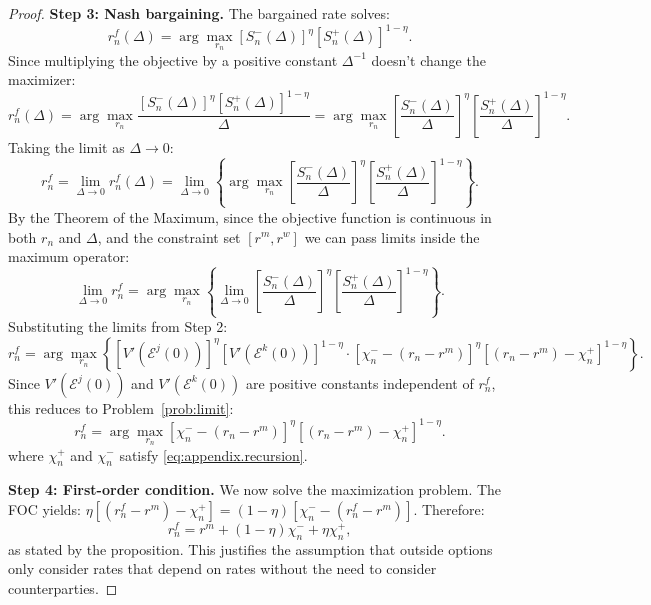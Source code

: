 \begin{proof}
\textbf{Step 3: Nash bargaining.} The bargained rate solves:
\[r_n^f(\Delta) = \arg\max_{r_n} [S_n^{-}(\Delta)]^{\eta}[S_n^{+}(\Delta)]^{1-\eta}.\]
Since multiplying the objective by a positive constant $\Delta^{-1}$ doesn't change the maximizer:
\[r_n^f(\Delta) = \arg\max_{r_n} \frac{[S_n^{-}(\Delta)]^{\eta}[S_n^{+}(\Delta)]^{1-\eta}}{\Delta}= \arg\max_{r_n} \left[\frac{S_n^{-}(\Delta)}{\Delta}\right]^{\eta}\left[\frac{S_n^{+}(\Delta)}{\Delta}\right]^{1-\eta}.\]
Taking the limit as $\Delta \to 0$:
\[r_n^f = \lim_{\Delta \to 0} r_n^f(\Delta) = \lim_{\Delta \to 0} \left\{\arg\max_{r_n} \left[\frac{S_n^{-}(\Delta)}{\Delta}\right]^{\eta}\left[\frac{S_n^{+}(\Delta)}{\Delta}\right]^{1-\eta}\right\}.\]
By the Theorem of the Maximum, since the objective function is continuous in both $r_n$ and $\Delta$, and the constraint set $[r^m, r^w]$ we can pass limits inside the maximum operator:
\[\lim_{\Delta \to 0}r_n^f = \arg\max_{r_n} \left\{\lim_{\Delta \to 0}\left[\frac{S_n^{-}(\Delta)}{\Delta}\right]^{\eta}\left[\frac{S_n^{+}(\Delta)}{\Delta}\right]^{1-\eta}\right\}.\]
Substituting the limits from Step 2:
\[r_n^f = \arg\max_{r_n} \left\{[V'(\mathcal{E}^j(0))]^{\eta}[V'(\mathcal{E}^k(0))]^{1-\eta} \cdot [\chi_n^{-} - (r_n - r^m)]^{\eta}[(r_n - r^m) - \chi_n^{+}]^{1-\eta}\right\}.\]
Since $V'(\mathcal{E}^j(0))$ and $V'(\mathcal{E}^k(0))$ are positive constants independent of $r_n^f$, this reduces to Problem~\ref{prob:limit}:
\[r_n^f = \arg\max_{r_n} [\chi_n^{-} - (r_n - r^m)]^{\eta}[(r_n - r^m) - \chi_n^{+}]^{1-\eta}.\]
where $\chi_n^{+}$ and $\chi_n^{-}$ satisfy \ref{eq:appendix.recursion}. 

\textbf{Step 4: First-order condition.} We now solve the maximization problem. The FOC yields: $\eta[(r_n^f - r^m) - \chi_n^{+}] = (1-\eta)[\chi_n^{-} - (r_n^f - r^m)].$
Therefore: 
\[
r_n^f = r^m + (1-\eta)\chi_n^{-} + \eta\chi_n^{+},
\] 
as stated by the proposition. This justifies the assumption that outside options only consider rates that depend on rates without the need to consider counterparties. 
\end{proof}